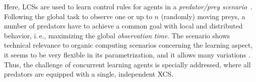 Here, LCSs are used to learn control rules for agents in a \emph{predator/prey scenario}~\cite{BJD86}. Following the global task to observe one or up to $n$ (randomly) moving preys, a number of predators 
have to achieve a common goal with local and distributed behavior, i.\,e., maximizing the global \emph{observation time}. The scenario shows technical relevance to organic computing scenarios concerning the learning aspect, it seems to be very flexible in its parametrization, and it allows many variations \cite{SV00}. %
Thus, the challenge of concurrent learning agents is specially addressed, where all predators are equipped with a single, independent XCS.
